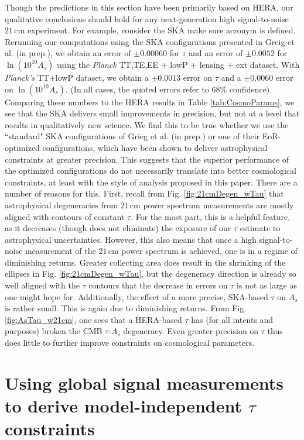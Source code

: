 \documentclass[twocolumn,aps,prd,nofootinbib,showpacs]{revtex4-1}
\begin{document}
Though the predictions in this section have been primarily based on HERA, our qualitative conclusions should hold for any next-generation high signal-to-noise $21\,\textrm{cm}$ experiment. For example, consider the SKA \acl{make sure acronym is defined}. Rerunning our computations using the SKA configurations presented in Greig et al. (in prep.), we obtain an error of $\pm 0.00060$ for $\tau$ and an error of $\pm 0.0052$ for $\ln (10^{10} A_s)$ using the \emph{Planck} TT,TE,EE + lowP + lensing + ext dataset. With \emph{Planck's} TT+lowP dataset, we obtain a $\pm 0.0013$ error on $\tau$ and a $\pm 0.0060$ error on $\ln (10^{10} A_s)$. (In all cases, the quoted errors refer to $68\%$ confidence). Comparing these numbers to the HERA results in Table \ref{tab:CosmoParams}, we see that the SKA delivers small improvements in precision, but not at a level that results in qualitatively new science.  We find this to be true whether we use the ``standard" SKA configurations of Grieg et al. (in prep.) or one of their EoR-optimized configurations, which have been shown to deliver astrophysical constraints at greater precision. This suggests that the superior performance of the optimized configurations do not necessarily translate into better cosmological constraints, at least with the style of analysis proposed in this paper. There are a number of reasons for this. First, recall from Fig. \ref{fig:21cmDegen_wTau} that astrophysical degeneracies from $21\,\textrm{cm}$ power spectrum measurements are mostly aligned with contours of constant $\tau$. For the most part, this is a helpful feature, as it decreases (though does not eliminate) the exposure of our $\tau$ estimate to astrophysical uncertainties. However, this also means that once a high signal-to-noise measurement of the $21\,\textrm{cm}$ power spectrum is achieved, one is in a regime of diminishing returns. Greater collecting area does result in the shrinking of the ellipses in Fig. \ref{fig:21cmDegen_wTau}, but the degeneracy direction is already so well aligned with the $\tau$ contours that the decrease in errors on $\tau$ is not as large as one might hope for. Additionally, the effect of a more precise, SKA-based $\tau$ on $A_s$ is rather small. This is again due to diminishing returns. From Fig. \ref{fig:AsTau_w21cm}, one sees that a HERA-based $\tau$ has (for all intents and purposes) broken the CMB $\tau$-$A_s$ degeneracy. Even greater precision on $\tau$ thus does little to further improve constraints on cosmological parameters.

\section{Using global signal measurements to derive model-independent $\tau$ constraints}
\label{sec:GlobalSig}
\end{document}
